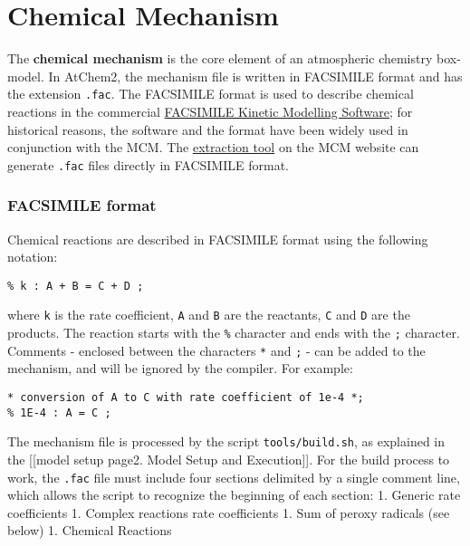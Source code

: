 \chapter{Chemical Mechanism}

The \textbf{chemical mechanism} is the core element of an atmospheric
chemistry box-model. In AtChem2, the mechanism file is written in
FACSIMILE format and has the extension \texttt{.fac}. The FACSIMILE
format is used to describe chemical reactions in the commercial
\href{http://www.mcpa-software.com/}{FACSIMILE Kinetic Modelling
Software}; for historical reasons, the software and the format have been
widely used in conjunction with the MCM. The
\href{http://mcm.leeds.ac.uk/MCMv3.3.1/extract.htt}{extraction tool} on
the MCM website can generate \texttt{.fac} files directly in FACSIMILE
format.

\hypertarget{facsimile-format}{%
\subsection{FACSIMILE format}\label{facsimile-format}}

Chemical reactions are described in FACSIMILE format using the following
notation:

\begin{verbatim}
% k : A + B = C + D ;
\end{verbatim}

where \texttt{k} is the rate coefficient, \texttt{A} and \texttt{B} are
the reactants, \texttt{C} and \texttt{D} are the products. The reaction
starts with the \texttt{\%} character and ends with the \texttt{;}
character. Comments - enclosed between the characters \texttt{*} and
\texttt{;} - can be added to the mechanism, and will be ignored by the
compiler. For example:

\begin{verbatim}
* conversion of A to C with rate coefficient of 1e-4 *;
% 1E-4 : A = C ;
\end{verbatim}

The mechanism file is processed by the script \texttt{tools/build.sh},
as explained in the {[}{[}model setup page\textbar{}2. Model Setup and
Execution{]}{]}. For the build process to work, the \texttt{.fac} file
must include four sections delimited by a single comment line, which
allows the script to recognize the beginning of each section: 1. Generic
rate coefficients 1. Complex reactions rate coefficients 1. Sum of
peroxy radicals (see below) 1. Chemical Reactions


